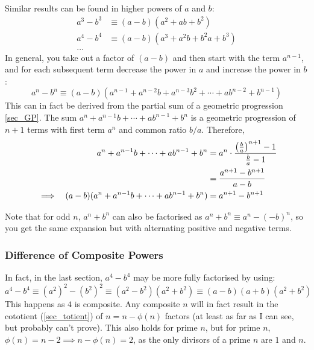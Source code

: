 Similar results can be found in higher powers of \(a\) and \(b\):
\begin{align*}
a^3 - b^3 &\equiv (a - b)(a^2 + ab + b^2) \\
a^4 - b^4 &\equiv (a - b)(a^3 + a^2b + b^2a + b^3) \\
\dots
\end{align*}
In general, you take out a factor of \((a - b)\) and then start with the
term \(a^{n - 1}\), and for each subsequent term decrease the power in \(a\)
and increase the power in \(b\):
\begin{equation}
a^n - b^n \equiv (a - b)(a^{n - 1} + a^{n - 2}b + a^{n - 3}b^2 + \dotsb +
                         ab^{n - 2} + b^{n - 1})
\end{equation}
This can in fact be derived from the partial sum of a geometric progression
\ref{sec_GP}. The sum \(a^n + a^{n - 1}b + \dotsb + ab^{n - 1} + b^n\) is
a geometric progression of \(n + 1\) terms with first term \(a^n\) and
common ratio \(b/a\).  Therefore,
\begin{alignat*}{2}
&&a^n + a^{n - 1}b + \dotsb + ab^{n - 1} + b^n &=
        a^n \cdot \frac{\pqty{\frac ba}^{n + 1} - 1}{\frac ba - 1} \\
&&    &= \frac{a^{n + 1} - b^{n + 1}}{a - b} \\
&\implies& (a - b)(a^n + a^{n - 1}b + \dotsb + ab^{n - 1} + b^n) &=
        a^{n + 1} - b^{n + 1}
\end{alignat*}

Note that for odd \(n\), \(a^n + b^n\) can also be factorised as
\(a^n + b^n \equiv a^n - (-b)^n\), so you get the same expansion but with
alternating positive and negative terms.


\subsubsection{Difference of Composite Powers}

In fact, in the last section, \(a^4 - b^4\) may be more fully factorised by
using:
\begin{equation*}
a^4 - b^4 \equiv (a^2)^2 - (b^2)^2 \equiv (a^2 - b^2)(a^2 + b^2) \equiv
    (a - b)(a + b)(a^2 + b^2)
\end{equation*}
This happens as \(4\) is composite. Any composite \(n\) will in fact result
in the cototient (\ref{sec_totient}) of \(n = n - \phi(n)\) factors (at
least as far as I can see, but probably can't prove). This
also holds for prime \(n\), but for prime \(n\),
\(\phi(n) = n - 2 \implies n - \phi(n) = 2\), as the only divisors of
a prime \(n\) are \(1\) and \(n\).

